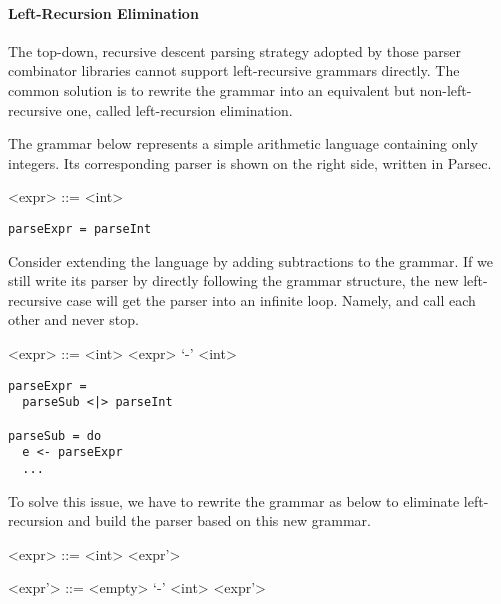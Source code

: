 \paragraph{Left-Recursion Elimination} The top-down, recursive descent parsing strategy adopted by those parser combinator libraries cannot support left-recursive grammars directly. The common solution is to rewrite the grammar into an equivalent but non-left-recursive one, called left-recursion elimination.

The grammar below represents a simple arithmetic language containing only integers. Its corresponding parser is shown on the right side, written in Parsec.

\begin{minipage}{10em}
\setlength{\grammarindent}{5em}
\begin{grammar}
<expr> ::= <int>
\end{grammar}
\end{minipage}
\begin{minipage}{10em}
\begin{lstlisting}[language=PlainCode]
parseExpr = parseInt
\end{lstlisting}
\end{minipage}

Consider extending the language by adding subtractions to the grammar. If we still write its parser by directly following the grammar structure, the new left-recursive case will get the parser into an infinite loop. Namely,  and  call each other and never stop.

\begin{minipage}{12em}
\setlength{\grammarindent}{4em}
\begin{grammar}
<expr> ::= <int> \alt <expr> `-' <int>
\end{grammar}
\end{minipage}
\begin{minipage}{15em}
\begin{lstlisting}[language=PlainCode]
parseExpr =
  parseSub <|> parseInt

parseSub = do
  e <- parseExpr
  ...
\end{lstlisting}
\end{minipage}

To solve this issue, we have to rewrite the grammar as below to eliminate left-recursion and build the parser based on this new grammar.

\vspace{0.4\baselineskip}
\begin{minipage}{15em}
\setlength{\grammarindent}{5em}
\begin{grammar}
<expr> ::= <int> <expr'>

<expr'> ::= <empty> \alt `-' <int> <expr'>
\end{grammar}
\end{minipage}
\vspace{0.4\baselineskip}

